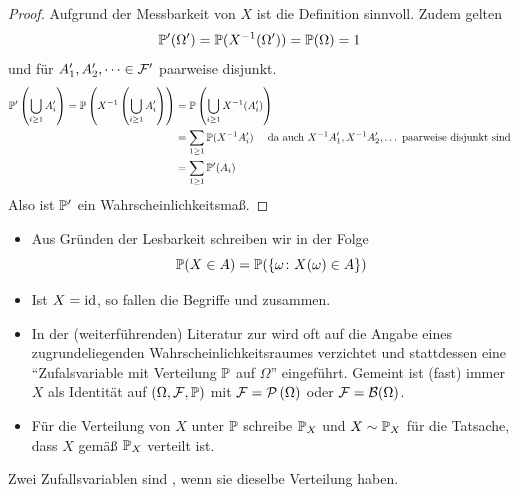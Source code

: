 \begin{proof}
    Aufgrund der Messbarkeit von $X$ ist die Definition sinnvoll. Zudem gelten
    \begin{equation*}
        \P'(\Omega') = \P(X^{-1}(\Omega')) = \P(\Omega) = 1
    \end{equation*}
    und für $A_1', A_2', \dots \in \ereignisF'$ paarweise disjunkt.
    \begin{equation*}
    \begin{aligned}
        \P' \left( \bigcup_{i \geq 1} A_i' \right) 
        = \P \left(X^{-1}\left( \bigcup_{i \geq 1} A_i' \right) \right) 
        &= \P \left( \bigcup_{i \geq 1} X^{-1}(A_i') \right) \\
        &= \sum_{1 \geq 1} \P(X^{-1} A_i') \quad \text{ da auch } X^{-1}A_1', X^{-1}A_2', \dots \text{ paarweise disjunkt sind} \\
        &= \sum_{1 \geq 1} \P'(A_i)
    \end{aligned}
    \end{equation*}
    Also ist $\P'$ ein Wahrscheinlichkeitsmaß.
\end{proof}

\begin{*bemerkung}
    \begin{itemize}[leftmargin=*, nolistsep]
        \item Aus Gründen der Lesbarkeit schreiben wir in der Folge
        \begin{equation*}
        	\P (X \in A) = \P ( \menge{\omega \colon X(\omega) \in A} )
        \end{equation*}
        \item Ist $X = \id$, so fallen die Begriffe \WMass und \WVerteilung zusammen.
        \item In der (weiterführenden) Literatur zur \WTheorie wird oft auf die Angabe eines zugrundeliegenden Wahrscheinlichkeitsraumes verzichtet und stattdessen eine ``Zufalsvariable mit Verteilung $\P$ auf $\Omega$'' eingeführt.
        Gemeint ist (fast) immer $X$ als Identität auf $(\Omega, \ereignisF, \P)$ mit $\ereignisF = \pows\Omega$ oder $\ereignisF = \borel\Omega$.
        \item Für die Verteilung von $X$ unter $\P$ schreibe $\P_X$ und $X \sim \P_{X}$ für die Tatsache, dass $X$ gemäß $\P_X$ verteilt ist.
    \end{itemize}
\end{*bemerkung}

\begin{definition}
    Zwei Zufallsvariablen sind , wenn sie dieselbe Verteilung haben.
\end{definition}

